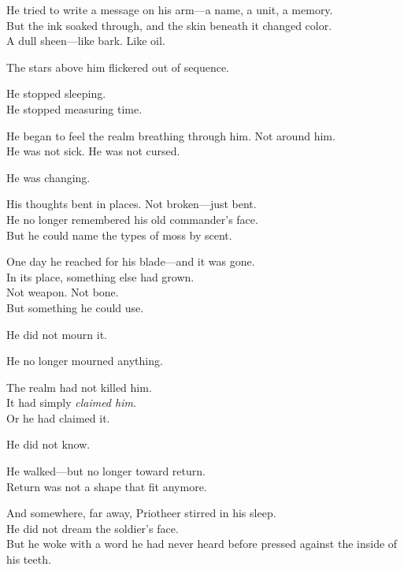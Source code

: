 \documentclass[12pt]{article}
\begin{document}
\vspace{0.5em}
He tried to write a message on his arm---a name, a unit, a memory.\\
But the ink soaked through, and the skin beneath it changed color.\\
A dull sheen---like bark. Like oil.

\vspace{0.5em}
The stars above him flickered out of sequence.

\vspace{0.5em}
He stopped sleeping.\\
He stopped measuring time.

\vspace{0.5em}
He began to feel the realm breathing through him. Not around him.\\
He was not sick. He was not cursed.

\vspace{0.5em}
He was changing.

\vspace{0.5em}
His thoughts bent in places. Not broken---just bent.\\
He no longer remembered his old commander’s face.\\
But he could name the types of moss by scent.

\vspace{0.5em}
One day he reached for his blade---and it was gone.\\
In its place, something else had grown.\\
Not weapon. Not bone.\\
But something he could use.

\vspace{0.5em}
He did not mourn it.

\vspace{0.5em}
He no longer mourned anything.

\vspace{0.5em}
The realm had not killed him.\\
It had simply \textit{claimed him}.\\
Or he had claimed it.

\vspace{0.5em}
He did not know.

\vspace{0.5em}
He walked---but no longer toward return.\\
Return was not a shape that fit anymore.

\vspace{0.5em}
And somewhere, far away, Priotheer stirred in his sleep.\\
He did not dream the soldier’s face.\\
But he woke with a word he had never heard before pressed against the inside of his teeth.
\end{document}
